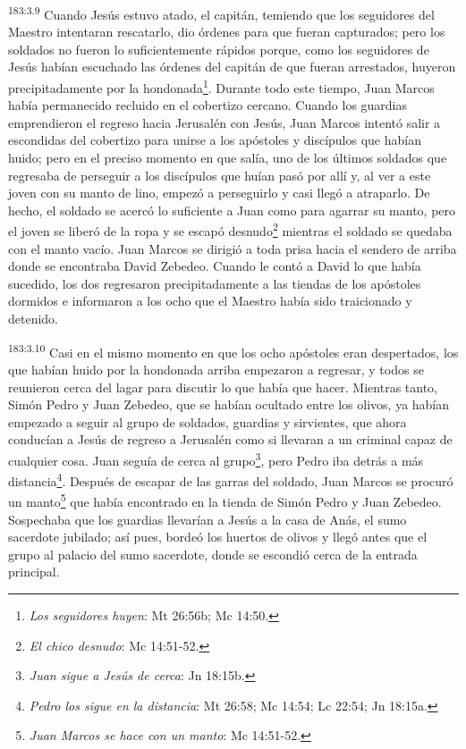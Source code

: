 \par
\textsuperscript{183:3.9} Cuando Jesús estuvo atado, el capitán, temiendo que los seguidores del Maestro intentaran rescatarlo, dio órdenes para que fueran capturados; pero los soldados no fueron lo suficientemente rápidos porque, como los seguidores de Jesús habían escuchado las órdenes del capitán de que fueran arrestados, huyeron precipitadamente por la hondonada\footnote{\textit{Los seguidores huyen}: Mt 26:56b; Mc 14:50.}. Durante todo este tiempo, Juan Marcos había permanecido recluido en el cobertizo cercano. Cuando los guardias emprendieron el regreso hacia Jerusalén con Jesús, Juan Marcos intentó salir a escondidas del cobertizo para unirse a los apóstoles y discípulos que habían huido; pero en el preciso momento en que salía, uno de los últimos soldados que regresaba de perseguir a los discípulos que huían pasó por allí y, al ver a este joven con su manto de lino, empezó a perseguirlo y casi llegó a atraparlo. De hecho, el soldado se acercó lo suficiente a Juan como para agarrar su manto, pero el joven se liberó de la ropa y se escapó desnudo\footnote{\textit{El chico desnudo}: Mc 14:51-52.} mientras el soldado se quedaba con el manto vacío. Juan Marcos se dirigió a toda prisa hacia el sendero de arriba donde se encontraba David Zebedeo. Cuando le contó a David lo que había sucedido, los dos regresaron precipitadamente a las tiendas de los apóstoles dormidos e informaron a los ocho que el Maestro había sido traicionado y detenido.

\par
\textsuperscript{183:3.10} Casi en el mismo momento en que los ocho apóstoles eran despertados, los que habían huido por la hondonada arriba empezaron a regresar, y todos se reunieron cerca del lagar para discutir lo que había que hacer. Mientras tanto, Simón Pedro y Juan Zebedeo, que se habían ocultado entre los olivos, ya habían empezado a seguir al grupo de soldados, guardias y sirvientes, que ahora conducían a Jesús de regreso a Jerusalén como si llevaran a un criminal capaz de cualquier cosa. Juan seguía de cerca al grupo\footnote{\textit{Juan sigue a Jesús de cerca}: Jn 18:15b.}, pero Pedro iba detrás a más distancia\footnote{\textit{Pedro los sigue en la distancia}: Mt 26:58; Mc 14:54; Lc 22:54; Jn 18:15a.}. Después de escapar de las garras del soldado, Juan Marcos se procuró un manto\footnote{\textit{Juan Marcos se hace con un manto}: Mc 14:51-52.} que había encontrado en la tienda de Simón Pedro y Juan Zebedeo. Sospechaba que los guardias llevarían a Jesús a la casa de Anás, el sumo sacerdote jubilado; así pues, bordeó los huertos de olivos y llegó antes que el grupo al palacio del sumo sacerdote, donde se escondió cerca de la entrada principal.

